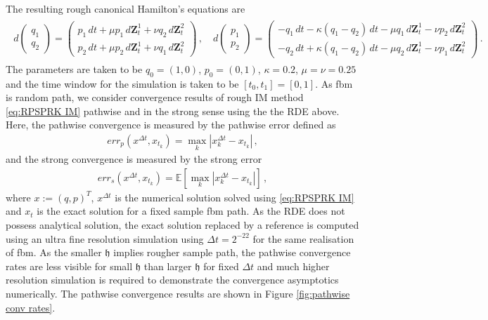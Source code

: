 \documentclass[11pt, oneside]{article}
\numberwithin{equation}{section}
\theoremstyle{definition}
\begin{document}
The resulting rough canonical Hamilton's equations are
\begin{align*}
    \begin{split}
        d\begin{pmatrix}
            q_1 \\q_2
        \end{pmatrix} 
        = 
        \begin{pmatrix}
            p_1 \,dt + \mu p_1 \,d\mathbf{Z}^1_t + \nu q_2\,d\mathbf{Z}^2_t \\
            p_2 \,dt + \mu p_2 \,d\mathbf{Z}^1_t + \nu q_1\,d\mathbf{Z}^2_t
        \end{pmatrix}\,,\quad
        d\begin{pmatrix}
            p_1 \\ p_2
        \end{pmatrix}
        = 
        \begin{pmatrix}
            -q_1\,dt - \kappa(q_1 - q_2)\,dt - \mu q_1\,d\mathbf{Z}^1_t - \nu p_2\,d\mathbf{Z}^2_t \\
            -q_2\,dt + \kappa(q_1 - q_2)\,dt - \mu q_2\,d\mathbf{Z}^1_t - \nu p_1\,d\mathbf{Z}^2_t 
        \end{pmatrix}\,.
    \end{split}
\end{align*}
The parameters are taken to be $q_0 = (1,0)$, $p_0 = (0,1)$, $\kappa = 0.2$, $\mu = \nu = 0.25$ and the time window for the simulation is taken to be $[t_0, t_1] = [0, 1]$.
As fbm is random path, we consider convergence results of rough IM method \eqref{eq:RPSPRK IM} pathwise and in the strong sense using the the RDE above. Here, the pathwise convergence is measured by the pathwise error defined as
\begin{align*}
    err_p(x^{\Delta t}, x_{t_k}) = \max_k |x^{\Delta t}_k - x_{t_k}|\,,
\end{align*}
and the strong convergence is measured by the strong error
\begin{align*}
    err_s(x^{\Delta t}, x_{t_k}) = \mathbb{E}[\max_k |x^{\Delta t}_k - x_{t_k}|]\,,
\end{align*}
where $x := (q,p)^T$, $x^{\Delta t}$ is the numerical solution solved using \eqref{eq:RPSPRK IM} and $x_{t}$ is the exact solution for a fixed sample fbm path. As the RDE does not possess analytical solution, the exact solution replaced by a reference is computed using an ultra fine resolution simulation using $\Delta t = 2^{-22}$ for the same realisation of fbm. As the smaller $\mathfrak{h}$ implies rougher sample path, the pathwise convergence rates are less visible for small $\mathfrak{h}$ than larger $\mathfrak{h}$ for fixed $\Delta t$ and much higher resolution simulation is required to demonstrate the convergence asymptotics numerically. The pathwise convergence results are shown in Figure \ref{fig:pathwise conv rates}.
\end{document}
